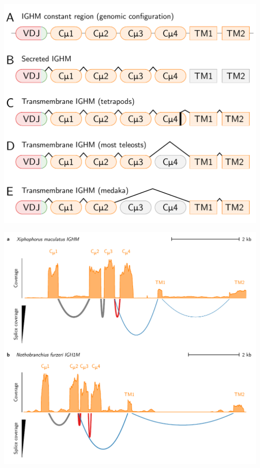 \documentclass[presentation]{beamer}
\begin{document}
\begin{frame}
\centering
\includegraphics[width=\textheight]{figs/pdf/extra/teleost-igm-exons}
\end{frame}

\begin{frame}
\centering
\includegraphics[height=\textheight]{figs/pdf/extra/ighm-sashimi-nolab}
\end{frame}
\end{document}
